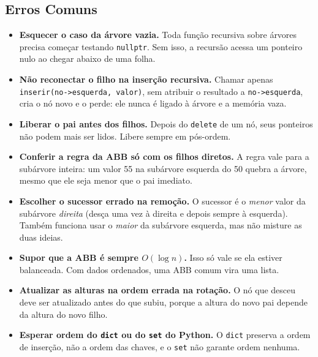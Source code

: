 \subsection{Erros Comuns}

\begin{itemize}
  \item \textbf{Esquecer o caso da árvore vazia.} Toda função recursiva sobre árvores precisa começar testando \texttt{nullptr}. Sem isso, a recursão acessa um ponteiro nulo ao chegar abaixo de uma folha.
  \item \textbf{Não reconectar o filho na inserção recursiva.} Chamar apenas \texttt{inserir(no->esquerda, valor)}, sem atribuir o resultado a \texttt{no->esquerda}, cria o nó novo e o perde: ele nunca é ligado à árvore e a memória vaza.
  \item \textbf{Liberar o pai antes dos filhos.} Depois do \texttt{delete} de um nó, seus ponteiros não podem mais ser lidos. Libere sempre em pós-ordem.
  \item \textbf{Conferir a regra da ABB só com os filhos diretos.} A regra vale para a subárvore inteira: um valor 55 na subárvore esquerda do 50 quebra a árvore, mesmo que ele seja menor que o pai imediato.
  \item \textbf{Escolher o sucessor errado na remoção.} O sucessor é o \textit{menor} valor da subárvore \textit{direita} (desça uma vez à direita e depois sempre à esquerda). Também funciona usar o \textit{maior} da subárvore esquerda, mas não misture as duas ideias.
  \item \textbf{Supor que a ABB é sempre $O(\log n)$.} Isso só vale se ela estiver balanceada. Com dados ordenados, uma ABB comum vira uma lista.
  \item \textbf{Atualizar as alturas na ordem errada na rotação.} O nó que desceu deve ser atualizado antes do que subiu, porque a altura do novo pai depende da altura do novo filho.
  \item \textbf{Esperar ordem do \texttt{dict} ou do \texttt{set} do Python.} O \texttt{dict} preserva a ordem de inserção, não a ordem das chaves, e o \texttt{set} não garante ordem nenhuma.
\end{itemize}
